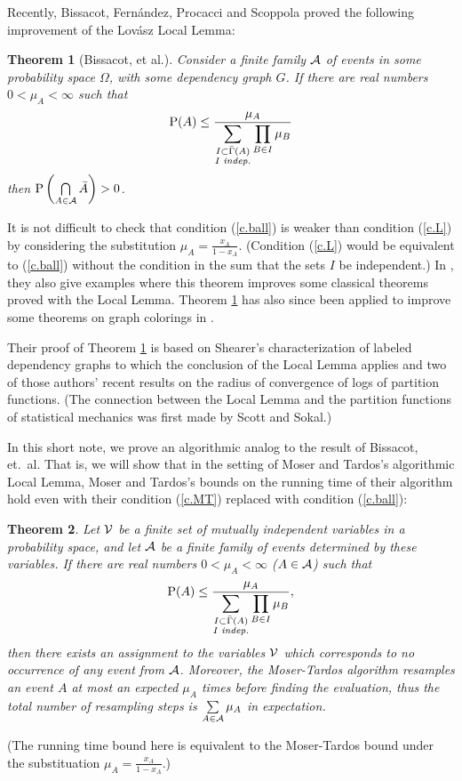 \documentclass[letterpaper]{article}
\newcommand{\p}{\textrm{P}}
\newcommand{\aaa}{{\cal A}}
\newcommand{\vvv}{{\cal V}}
\newcommand{\sbs}{\subset}
\newcommand{\bfrac}[2]{\frac{\displaystyle #1}{\displaystyle #2}}
\newtheorem{theorem}{Theorem}[section]
\theoremstyle{definition}
\theoremstyle{remark}
\begin{document}
Recently, Bissacot, Fern\'andez, Procacci and Scoppola proved the following improvement of the Lov\'asz Local Lemma:
\begin{theorem}[Bissacot, et al.\cite{BFPS}]
\label{t.ball}
  Consider a finite family $\aaa$ of events in some probability space $\Omega$, with some dependency graph $G$.   If there are real numbers $0<\mu_A<\infty$ such that
\begin{equation}
\p(A)\leq 
\bfrac{\mu_A}{\sum_{\substack{I\sbs \bar\Gamma(A)\\ I \textrm{ \emph{indep.}}}} \prod_{B\in I}\mu_B}
\label{c.ball}
\end{equation}
then $\p\left(\bigcap\limits_{A\in \aaa}\bar A\right)>0$.
\end{theorem}
\noindent It is not difficult to check that condition (\ref{c.ball}) is weaker than condition (\ref{c.L}) by considering the substitution $\mu_A=\frac{x_A}{1-x_A}$.  (Condition (\ref{c.L}) would be equivalent to (\ref{c.ball}) without the condition in the sum that the sets $I$ be independent.)  In \cite{BFPS}, they also give examples where this theorem improves some classical theorems proved with the Local Lemma.  Theorem \ref{t.ball} has also since been applied to improve some theorems on graph colorings in \cite{nlapp}.

Their proof of Theorem \ref{t.ball} is based on Shearer's characterization of labeled dependency graphs to which the conclusion of the Local Lemma applies\cite{Sh} and two of those authors' recent results on the radius of convergence of logs of partition functions\cite{cluster}.  (The connection between the Local Lemma and the partition functions of statistical mechanics was first made by Scott and Sokal\cite{SS}.)

In this short note, we prove an algorithmic analog to the result of Bissacot, et.~al.  That is, we will show that in the setting of Moser and Tardos's algorithmic Local Lemma, Moser and Tardos's bounds on the running time of their algorithm hold even with their condition (\ref{c.MT}) replaced with condition (\ref{c.ball}):

\begin{theorem}
\label{t.algimp}
  Let $\vvv$ be a finite set of mutually independent variables in a probability space, and let $\aaa$ be a finite family of events determined by these variables.  If there are real numbers $0<\mu_A<\infty$ ($A\in \aaa$) such that
\begin{equation}
\p(A)\leq 
\bfrac{\mu_A}{\sum_{\substack{I\sbs \bar\Gamma(A)\\ I \textrm{ \emph{indep.}}}} \prod_{B\in I}\mu_B},
\label{l.icond}
\end{equation}
then there exists an assignment to the variables $\vvv$ which corresponds to no occurrence of any event from $\aaa$.  Moreover, the Moser-Tardos algorithm resamples an event $A$ at most an expected $\mu_A$ times before finding the evaluation, thus the total number of resampling steps is $\sum\limits_{A\in \aaa}\mu_A$ in expectation.
\end{theorem}
\noindent (The running time bound here is equivalent to the Moser-Tardos bound under the substituation $\mu_A=\frac{x_A}{1-x_A}$.)
\end{document}
